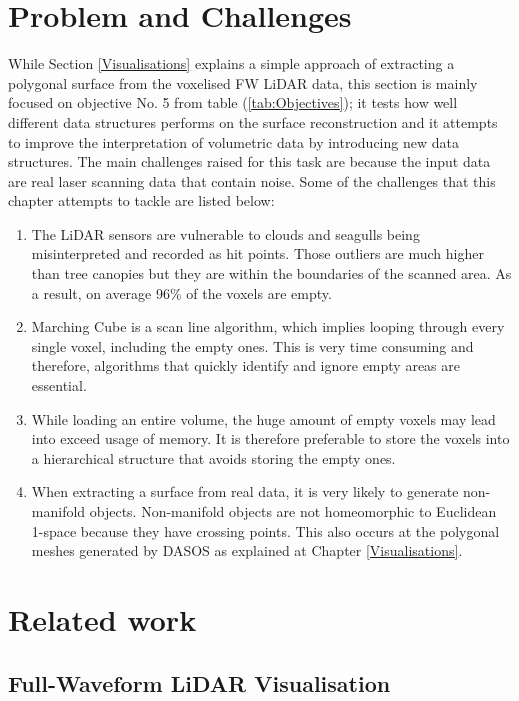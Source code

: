 \documentclass{subfiles}
\begin{document}
	
\section{Problem and Challenges}\label{sec:Opt:Challenges}
{\color{blue}	
	\par While Section \ref{Visualisations} explains a simple approach of extracting a polygonal surface from the voxelised FW LiDAR data, this section is mainly focused on objective No. 5 from table (\ref{tab:Objectives}); it tests how well different data structures performs on the surface reconstruction and it attempts to improve the interpretation of volumetric data by introducing new data structures. The main challenges raised for this task are because the input data are real laser scanning data that contain noise. Some of the challenges that this chapter attempts to tackle are listed below:
  \begin{enumerate}
		\item The LiDAR sensors are vulnerable to clouds and seagulls being misinterpreted and recorded as hit points. Those outliers are much higher than tree canopies but they are within the boundaries of the scanned area. As a result, on average 96\% of the voxels are empty.   	
		\item Marching Cube is a scan line algorithm, which implies looping through every single voxel, including the empty ones. This is very time consuming and therefore, algorithms that quickly identify and ignore empty areas are essential. 
		\item While loading an entire volume, the huge amount of empty voxels may lead into exceed usage of memory. It is therefore preferable to store the voxels into a hierarchical structure that avoids storing the empty ones.
		\item When extracting a surface from real data, it is very likely to generate non-manifold objects. Non-manifold objects are not homeomorphic to Euclidean 1-space because they have crossing points. This also occurs at the polygonal meshes generated by DASOS as explained at Chapter \ref{Visualisations}.
	\end{enumerate}

	
}

\section{Related work}
\subsection{Full-Waveform LiDAR Visualisation}
\end{document}
